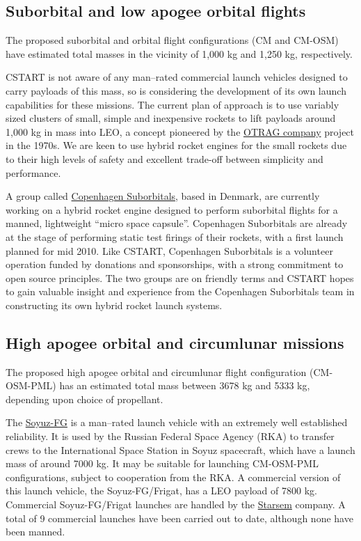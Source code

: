 \documentclass{report}
\begin{document}
\subsection{Suborbital and low apogee orbital flights}

The proposed suborbital and orbital flight configurations (CM and CM-OSM) have estimated total masses in the vicinity of 1,000 kg and 1,250 kg, respectively.

CSTART is not aware of any man--rated commercial launch vehicles designed to carry payloads of this mass, so is considering the development of its own launch capabilities for these missions.  The current plan of approach is to use variably sized clusters of small, simple and inexpensive rockets to lift payloads around 1,000 kg in mass into LEO, a concept pioneered by the \href{http://en.wikipedia.org/wiki/OTRAG}{OTRAG company} project in the 1970s.  We are keen to use hybrid rocket engines for the small rockets due to their high levels of safety and excellent trade-off between simplicity and performance.

A group called \href{http://www.copenhagensuborbitals.com/}{Copenhagen Suborbitals}, based in Denmark, are currently working on a hybrid rocket engine designed to perform suborbital flights for a manned, lightweight ``micro space capsule''.  Copenhagen Suborbitals are already at the stage of performing static test firings of their rockets, with a first launch planned for mid 2010.  Like CSTART, Copenhagen Suborbitals is a volunteer operation funded by donations and sponsorships, with a strong commitment to open source principles.  The two groups are on friendly terms and CSTART hopes to gain valuable insight and experience from the Copenhagen Suborbitals team in constructing its own hybrid rocket launch systems.

\subsection{High apogee orbital and circumlunar missions}

The proposed high apogee orbital and circumlunar flight configuration (CM-OSM-PML) has an estimated total mass between 3678 kg and 5333 kg, depending upon choice of propellant.

The \href{http://en.wikipedia.org/wiki/Soyuz-FG}{Soyuz-FG} is a man--rated launch vehicle with an extremely well established reliability.  It is used by the Russian Federal Space Agency (RKA) to transfer crews to the International Space Station in Soyuz spacecraft, which have a launch mass of around 7000 kg.  It may be suitable for launching CM-OSM-PML configurations, subject to cooperation from the RKA.  A commercial version of this launch vehicle, the Soyuz-FG/Frigat, has a LEO payload of 7800 kg.  Commercial Soyuz-FG/Frigat launches are handled by the \href{http://www.starsem.com}{Starsem} company.  A total of 9 commercial launches have been carried out to date, although none have been manned.
\end{document}
